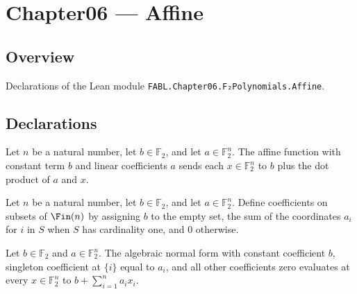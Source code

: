 \chapter{Chapter06 — Affine}
\section{Overview}

Declarations of the Lean module \texttt{FABL.Chapter06.F₂Polynomials.Affine}.

\section{Declarations}

\begin{definition}
\label{FABL.affineFunction}
\leanok
{}
Let $n$ be a natural number, let $b\in\mathbb{F}_2$, and let $a\in\mathbb{F}_2^n$. The affine function
with constant term $b$ and linear coefficients $a$ sends each $x\in\mathbb{F}_2^n$ to $b$ plus
the dot product of $a$ and $x$.
\end{definition}

\begin{definition}
\label{FABL.affineCoefficients}
\leanok
{}
Let $n$ be a natural number, let $b\in\mathbb{F}_2$, and let $a\in\mathbb{F}_2^n$. Define coefficients on
subsets of $\Fin(n)$ by assigning $b$ to the empty set, the sum of the coordinates $a_i$ for
$i$ in $S$ when $S$ has cardinality one, and $0$ otherwise.
\end{definition}

\begin{theorem}
\label{FABL.anfEval_affineCoefficients}
\leanok
{}
Let $b\in\mathbb{F}_2$ and $a\in\mathbb{F}_2^n$. The algebraic normal form with constant
coefficient $b$, singleton coefficient at $\{i\}$ equal to $a_i$, and all other
coefficients zero evaluates at every $x\in\mathbb{F}_2^n$ to $b+\sum_{i=1}^n a_i x_i$.
\end{theorem}

